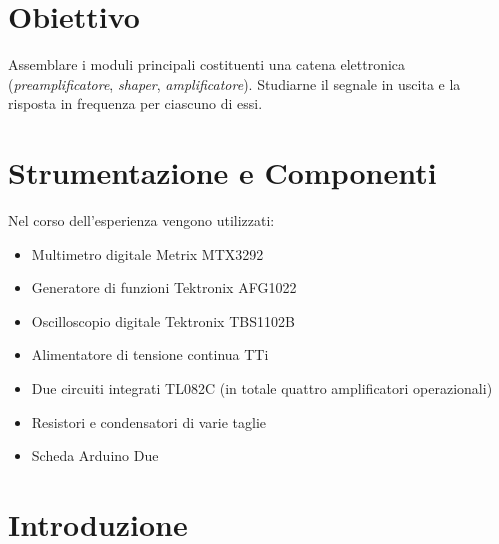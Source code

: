 \documentclass[a4paper,11pt]{article} %
\begin{document}
\section{Obiettivo}

Assemblare i moduli principali costituenti una catena elettronica (\textit{preamplificatore}, \textit{shaper},
\textit{amplificatore}). Studiarne il segnale in uscita e la risposta in frequenza per ciascuno di essi.


\section{Strumentazione e Componenti}\label{s:strumenti}

Nel corso dell'esperienza vengono utilizzati:
\begin{itemize}[itemsep=-0.5ex]
	\item Multimetro digitale Metrix MTX3292
	\item Generatore di funzioni Tektronix AFG1022
	\item Oscilloscopio digitale Tektronix TBS1102B
	\item Alimentatore di tensione continua TTi
	\item Due circuiti integrati TL082C (in totale quattro amplificatori operazionali)
	\item Resistori e condensatori di varie taglie
	\item Scheda Arduino Due
\end{itemize}


\section{Introduzione}\label{s:intro}
\end{document}
